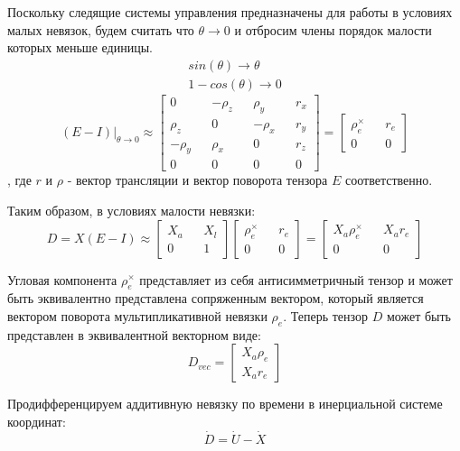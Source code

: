 \documentclass[a4paper]{article}
\begin{document}
Поскольку следящие системы управления предназначены для работы в условиях малых невязок, будем считать что $\theta \rightarrow 0$ и отбросим члены порядок малости которых меньше единицы.
\begin{eqnarray}
sin(\theta) \rightarrow \theta\\
1 - cos(\theta) \rightarrow 0
\end{eqnarray}
\begin{equation}
(E - I)|_{\theta\rightarrow0} \approx 
\begin{bmatrix}
0         && -\rho_z &&  \rho_y && r_x\\
 \rho_z && 0         && -\rho_x && r_y\\
-\rho_y &&  \rho_x && 0         && r_z\\
0&&0&&0&&0
\end{bmatrix} = \begin{bmatrix}\rho_e^\times&&r_e\\0&&0\end{bmatrix}
\end{equation}
, где $r$ и $\rho$ - вектор трансляции и вектор поворота тензора $E$ соответственно.

Таким образом, в условиях малости невязки:
\begin{equation} D = X (E-I) \approx \begin{bmatrix}X_a&&X_l\\0&&1\end{bmatrix} \begin{bmatrix}\rho_e^\times&&r_e\\0&&0\end{bmatrix} = \begin{bmatrix}X_a\rho_e^\times&&X_ar_e\\0&&0\end{bmatrix} \end{equation}

Угловая компонента $\rho_e^\times$ представляет из себя антисимметричный тензор и может быть эквивалентно представлена сопряженным вектором, который является вектором поворота мультипликативной невязки $\rho_e$.  Теперь тензор $D$ может быть представлен в эквивалентной векторном виде:
\begin{equation} D_{vec} = \begin{bmatrix}X_a\rho_e\\X_ar_e\end{bmatrix} \end{equation}

Продифференцируем аддитивную невязку по времени в инерциальной системе координат:
\begin{equation} \dot{D} = \dot{U} -\dot{X} \end{equation}
\end{document}
